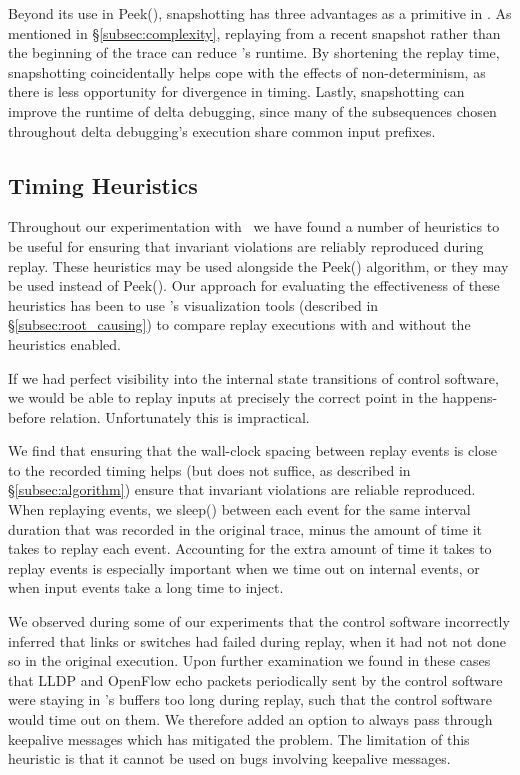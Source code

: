 Beyond its use in Peek(), snapshotting has three advantages as a primitive
in \projectname. As mentioned in \S\ref{subsec:complexity}, replaying from a
recent snapshot rather than the beginning of the trace can reduce \simulator's runtime.
By shortening the replay time, snapshotting coincidentally helps cope
with the effects of non-determinism, as there is less opportunity for
divergence in timing. Lastly, snapshotting can improve the runtime of delta
debugging, since many of the subsequences chosen throughout delta debugging's
execution share common input prefixes.

\subsection{Timing Heuristics}
\label{subsec:timing_heuristics}

Throughout our experimentation with \projectname~we have found a number of
heuristics to be useful for ensuring that invariant violations are reliably reproduced during replay.
These heuristics may be used alongside the Peek() algorithm, or they may be
used instead of Peek(). Our approach for evaluating the effectiveness
of these heuristics has been to use \projectname's visualization tools
(described in \S\ref{subsec:root_causing}) to compare replay executions with and
without the heuristics enabled.

 If we had perfect visibility into
the internal state transitions of control software, we would be able to replay inputs at precisely the correct point in
the happens-before relation. Unfortunately this is impractical.

We find that ensuring that the wall-clock spacing between replay events
is close to the recorded timing helps (but does not suffice, as described in
\S\ref{subsec:algorithm}) ensure that invariant violations are reliable
reproduced. When replaying events, we sleep() between each
event for the same interval duration that was recorded in the original trace,
minus the amount of time it takes to replay each event. Accounting for the
extra amount of time it takes to replay events is especially important when we
time out on internal events, or when input events take a long time to inject.

 We observed during some
of our experiments that the control software incorrectly inferred that links or switches had
failed during replay, when it had not not done so in the original execution.
Upon further examination we found in these cases that LLDP and OpenFlow echo
packets periodically sent by the control software were
staying in \projectname's buffers too long during replay, such that the
control software would time out on them. We therefore added an option to always pass through
keepalive messages which has mitigated the problem. The limitation of this
heuristic is that it cannot be used on bugs involving keepalive messages.

